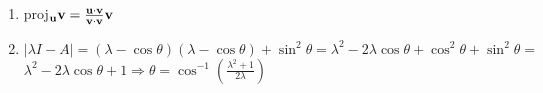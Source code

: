 \documentclass[12pt]{article}
\begin{document}
\begin{enumerate}
\begin{enumerate}
      \item $\lambda=-1\Rightarrow \left[ \begin{array}{ccc|c} -1 & -2 & 1 & 0\\ 1 & -4 & -1 & 0\\ 0 & 0 & 0 & 0  \end{array} \right]\Rightarrow B_1=\left\{ (1,0,1) \right\}\text{ and }\lambda=1\Rightarrow\left[ \begin{array}{ccc|c} 1 & -2 & 1 & 0\\ 1 & -2 & 1& 0\\ 0 & 0 & 2 & 0  \end{array} \right]\Rightarrow B_2=\left\{ 2,1, 0\right\}\text{ and }\lambda=2\Rightarrow\left[ \begin{array}{ccc|c} 2 & -2 & 1 & 0\\ 1 & -1 & -1 & 0\\ 0 & 0 & 3 & 0  \end{array} \right]\Rightarrow B_3=\left\{(1,1,0)\right\}$

      \item $\begin{bmatrix} -1 &0&0\\ 0&1&0\\0&0&2\end{bmatrix}$

    \end{enumerate}

    \setcounter{enumi}{59}

  \item proj$_{\bold{u}}\bold{v}=\frac{\bold{u}\cdot\bold{v}}{\bold{v}\cdot\bold{v}}\bold{v}$

    \setcounter{enumi}{77}

  \item $|\lambda I-A|=(\lambda-\cos\theta)(\lambda-\cos\theta)+\sin^2\theta=\lambda^2-2\lambda\cos\theta+\cos^2\theta+\sin^2\theta=$\\$\lambda^2-2\lambda\cos\theta+1\Rightarrow \theta=\cos^{-1}\left( \frac{\lambda^2+1}{2\lambda} \right)$

\end{enumerate}
\end{document}
